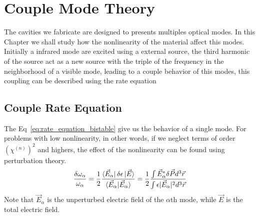 \chapter{Couple Mode Theory}
\label{chap:couple_mode}

The cavities we fabricate are designed to presents multiples optical modes. In this Chapter we shall study how the nonlinearity of the material affect this modes. Initially a infrared mode are excited using a external source, the third harmonic of the source act as a new source with the triple of the frequency in the neighborhood of a visible mode, leading to a couple behavior of this modes, this coupling can be described using the rate equation  

\section{Couple Rate Equation}
%
%

The Eq~\ref{eq:rate_equation_bistable} give us the behavior of a single mode. For problems with low nonlinearity, in other words, if we neglect terms of order $\left(\chi^{(n)}\right)^2$ and highers, the effect of the nonlinearity can be found using perturbation theory. 
\begin{equation}
    \frac{\delta\omega_\alpha}{\omega_\alpha} = \frac{1}{2}\frac{\bra{\vec{E}_\alpha}\delta\epsilon\ket{\vec{E}}}{\braket{\vec{E}_\alpha|\vec{E}_\alpha}} = \frac{1}{2}\frac{\int\vec{E}^*_\alpha\delta\vec{P}d^3\vec{r}}{\int \epsilon|\vec{E}_\alpha|^2d^3\vec{r}}
    \label{eq:perp_theory}
\end{equation}
Note that $\vec{E}_\alpha$ is the unperturbed electric field of the $\alpha$th mode, while $\vec{E}$ is the total electric field. 

